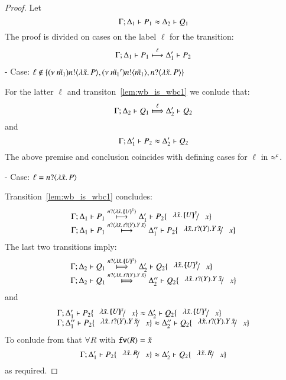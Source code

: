 \begin{proof}
	Let
	\[
		\Gamma; \Delta_1 \vdash P_1 \approx \Delta_2 \vdash Q_1
	\]
	The proof is divided on cases on the label $\ell$ for the transition:
%
	\begin{eqnarray}
		\Gamma; \Delta_1 \vdash P_1 \stackrel{\ell}{\longmapsto} \Delta_1' \vdash P_2
		\label{lem:wb_is_wbc1}
	\end{eqnarray}
%
	\noi - Case: $\ell \notin \{ (\nu\ \tilde{m_1}) n ! \langle \lambda \tilde{x}.\,P \rangle,  (\nu\ \tilde{m_1}') n ! \langle \tilde{m_1} \rangle, n ? \langle \lambda \tilde{x}.\,P \rangle \}$

	\noi For the latter $\ell$ and transiton~\ref{lem:wb_is_wbc1} we conlude that:	
%
	\[
		\horel{\Gamma}{\Delta_2}{Q_1}{\Hby{\ell}}{\Delta_2'}{Q_2}
	\]
%
	\noi and
%
	\[
		\Gamma; \Delta_1' \vdash P_2 \approx \Delta_2' \vdash Q_2
	\]
%
	The above premise and conclusion coincides with defining cases for $\ell$ in $\approx^{c}$.

	\noi - Case: $\ell = n ? \langle \lambda \tilde{x}.\,P \rangle$

	\noi Transition~\ref{lem:wb_is_wbc1} concludes:
%
\[
	\begin{array}{l}
		\horel{\Gamma}{\Delta_1}{P_1}{\hby{\bactinp{n}{\abs{\tilde{x}}{\mapchar{U}{\tilde{x}}}}}}{\Delta_1'}{P_2 \subst{\abs{\tilde{x}}{\mapchar{U}{\tilde{x}}}}{x}}\\
		\horel{\Gamma}{\Delta_1}{P_1}{\hby{\bactinp{n}{\abs{\tilde{x}}{\binp{t}{Y} \appl{Y}{\tilde{x}}}}}}{\Delta_1''}{P_2 \subst{\abs{\tilde{x}}{\binp{t}{Y} \appl{Y}{\tilde{x}}}}{x}}
	\end{array}
\]
%
	\noi The last two transitions imply:
%
\[
	\begin{array}{l}
		\horel{\Gamma}{\Delta_2}{Q_1}{\Hby{\bactinp{n}{\abs{\tilde{x}}{\mapchar{U}{\tilde{x}}}}}}{\Delta_2'}{Q_2 \subst{\abs{\tilde{x}}{\mapchar{U}{\tilde{x}}}}{x}}\\
		\horel{\Gamma}{\Delta_2}{Q_1}{\Hby{\bactinp{n}{\abs{\tilde{x}}{\binp{t}{Y} \appl{Y}{\tilde{x}}}}}}{\Delta_2''}{Q_2 \subst{\abs{\tilde{x}}{\binp{t}{Y} \appl{Y}{\tilde{x}}}}{x}}
	\end{array}
\]
%
	\noi and
%
\[
	\begin{array}{l}
		\horel{\Gamma}{\Delta_1'}{P_2 \subst{\abs{\tilde{x}}{\mapchar{U}{\tilde{x}}}}{x}}{\wb}{\Delta_2'}{Q_2 \subst{\abs{\tilde{x}}{\mapchar{U}{\tilde{x}}}}{x}}\\
		\horel{\Gamma}{\Delta_1''}{P_2 \subst{\abs{\tilde{x}}{\binp{t}{Y} \appl{Y}{\tilde{x}}}}{x}}{\wb}{\Delta_2''}{Q_2 \subst{\abs{\tilde{x}}{\binp{t}{Y} \appl{Y}{\tilde{x}}}}{x}}
	\end{array}
\]
%
	\noi To conlude from  that
	$\forall R$ with $\mathtt{fv}(R) = \tilde{x}$
%
\[
	\horel{\Gamma}{\Delta_1'}{P_2 \subst{\abs{\tilde{x}}{R}}{x}}{\wb}{\Delta_2'}{Q_2 \subst{\abs{\tilde{x}}{R}}{x}}
\]
%
	\noi as required.


\end{proof}
